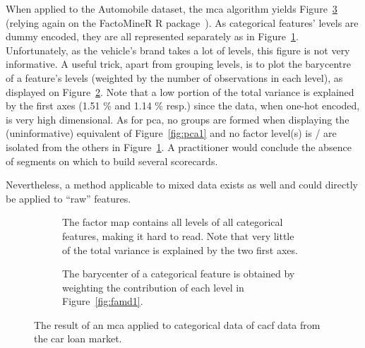 When applied to the Automobile dataset, the \gls{mca} algorithm yields Figure~\ref{fig:mca} (relying again on the FactoMineR \textsc{R} package~\cite{JSSv025i01}). As categorical features' levels are dummy encoded, they are all represented separately as in Figure~\ref{fig:mca1}. Unfortunately, as the vehicle's brand takes a lot of levels, this figure is not very informative. A useful trick, apart from grouping levels, is to plot the barycentre of a feature's levels (weighted by the number of observations in each level), as displayed on Figure~\ref{fig:mca2}. Note that a low portion of the total variance is explained by the first axes (1.51 \% and 1.14 \% resp.) since the data, when one-hot encoded, is very high dimensional. As for \gls{pca}, no groups are formed when displaying the (uninformative) equivalent of Figure~\ref{fig:pca1} and no factor level(s) is / are isolated from the others in Figure~\ref{fig:mca1}. A practitioner would conclude the absence of segments on which to build several scorecards.

Nevertheless, a method applicable to mixed data exists as well and could directly be applied to ``raw'' features.

\begin{figure}[!htb]
{\setlength{\parindent}{0cm}}

\begin{multicols}{2}
\centering
\begin{subfigure}[t]{0.45\textwidth}
\centering
\resizebox{\textwidth}{!}{}
\caption{\label{fig:mca1} The factor map contains all levels of all categorical features, making it hard to read. Note that very little of the total variance is explained by the two first axes.}
\end{subfigure}%
\columnbreak
\hspace*{1cm} \begin{subfigure}[t]{0.45\textwidth}
\centering
\resizebox{\textwidth}{!}{}
\caption{\label{fig:mca2} The barycenter of a categorical feature is obtained by weighting the contribution of each level in Figure~\ref{fig:famd1}.}
\end{subfigure}
\end{multicols}

\caption{\label{fig:mca} The result of an \gls{mca} applied to categorical data of \gls{cacf} data from the car loan market.}
\end{figure}

\paragraph{}

